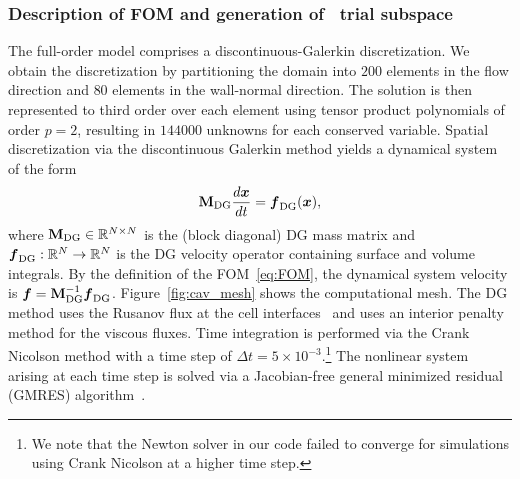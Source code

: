 \subsubsection{Description of FOM and generation of \spatialAcronym\ trial subspace}
The full-order model comprises a discontinuous-Galerkin discretization. We obtain the discretization 
by partitioning the domain into $200$ elements in the flow direction and $80$ elements 
in the wall-normal direction. The solution is then represented to third order over each element using tensor product polynomials of order $p=2$, 
resulting in $144000$ unknowns for each conserved variable. Spatial discretization via the discontinuous Galerkin method yields a dynamical system 
of the form
$$  \mathbf{M}_{\text{DG}}\frac{d \boldsymbol x}{dt} = \boldsymbol f_{\text{DG}} (\boldsymbol x),$$
where $\mathbf{M}_{\text{DG}} \in \mathbb{R}^{N \times N}$ is the (block diagonal) DG mass matrix and $\boldsymbol f_{\text{DG}}: \mathbb{R}^{N} \rightarrow \mathbb{R}^{N}$ is the DG velocity operator containing 
surface and volume integrals. By the definition of the FOM~\eqref{eq:FOM}, the dynamical system velocity is $\boldsymbol f = \mathbf{M}_{\text{DG}}^{-1} \boldsymbol f_{\text{DG}}$. 
Figure~\ref{fig:cav_mesh} shows the computational mesh. The 
DG method uses the Rusanov flux at the cell interfaces~\cite{rusanov} and uses an interior penalty method for the viscous fluxes. Time integration 
is performed via the Crank Nicolson method  with a time step of $\Delta t = 5 \times 10^{-3}.$\footnote{We note that the Newton solver in our code failed to converge for simulations using Crank Nicolson at a higher time step.} The nonlinear system arising at each time step is solved via a Jacobian-free general minimized residual (GMRES) algorithm~\cite{gmres,jfnk}. 
 
